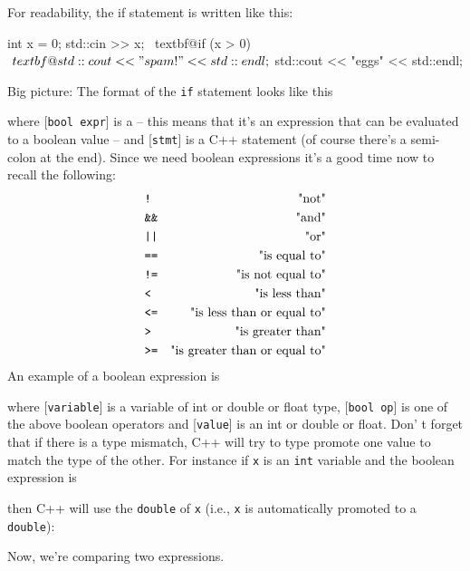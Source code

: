 For readability, the if statement is written like this:\\
\begin{console}[commandchars=\~\@\$]
int x = 0;
std::cin >> x;
~textbf@if (x > 0)$
   ~textbf@std::cout << "spam!" << std::endl;$
std::cout << "eggs" << std::endl;
\end{console}
Big picture: The format of the \texttt{if} statement looks like this
\begin{center}

\EMPHASIZE{[stmt]}
\end{center}
where [\verb!bool expr!] is a  -- this
means that it's an expression that can be evaluated to a
boolean value -- and [\verb!stmt!] is a C++ statement (of course
there's a semi-colon at the end). Since we need boolean
expressions it's a good time now to recall the
following:
\begin{align*}
 & \texttt{!} & \text{"not"}\\
 & \texttt{\&\&} & \text{"and"}\\
 & \texttt{\textbar\textbar{}} & \text{"or"}\\
 & \texttt{==} & \text{"is equal to"}\\
 & \texttt{!=} & \text{"is not equal to"}\\
 & \texttt{\textless{}} & \text{"is less than"}\\
 & \texttt{\textless=} & \text{"is less than or equal to"}\\
 & \texttt{>} & \text{"is greater than"}\\
 & \texttt{>=} & \text{"is greater than or equal to"}\\
\end{align*}
An example of a boolean expression is

\EMPHASIZE{[variable] [bool op] [value]}

where [\verb!variable!] is a variable of int or double or float type, [\verb!bool op!] is one of the above boolean operators and [\verb!value!] is
an int or double or float. Don' t forget that if there is
a type mismatch, C++ will try to type promote one value to match the
type of the other. For instance if \verb!x! is an \verb!int! variable
and the boolean expression is


then C++ will use the \verb!double! of \verb!x! (i.e., \verb!x! is
automatically promoted to a \verb!double!):









Now, we're comparing two expressions.



